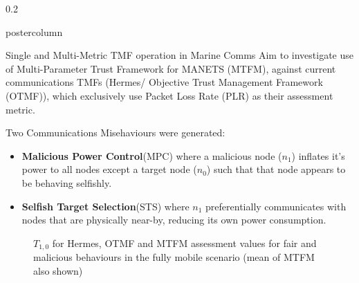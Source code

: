 \documentclass[final,hyperref={pdfpagelabels=false}]{beamer}
\def\colwidth{0.2\linewidth}
\begin{document}
\begin{frame}[fragile]
\begin{columns}[T]
\begin{column}{\colwidth}
\begin{beamercolorbox}[center,wd=\textwidth]{postercolumn}
\begin{minipage}[T]{.98\textwidth}
{\begin{block}{Single and Multi-Metric TMF operation in Marine Comms}
                Aim to investigate use of Multi-Parameter Trust Framework for MANETS (MTFM), against current communications TMFs (Hermes/ Objective Trust Management Framework (OTMF)), which exclusively use Packet Loss Rate (PLR) as their assessment metric.  

                \vspace{0.3\baselineskip}
							
                Two Communications Misehaviours were generated:
                \begin{itemize}
                  \item \textbf{Malicious Power Control}(MPC) where a malicious node ($n_1$) inflates it's power to all nodes except a target node ($n_0$) such that that node appears to be behaving selfishly.
                  \item \textbf{Selfish Target Selection}(STS) where $n_1$ preferentially communicates with nodes that are physically near-by, reducing its own power consumption.
                \end{itemize}

                \begin{figure}[t]
                  \caption{$T_{1,0}$ for Hermes, OTMF and MTFM assessment values for fair and malicious behaviours in the fully mobile scenario (mean of MTFM also shown)}
                  \label{fig:otmf_beta_comparison}
                \end{figure}


\end{block}}
\end{minipage}
\end{beamercolorbox}
\end{column}
\end{columns}
\end{frame}
\end{document}
